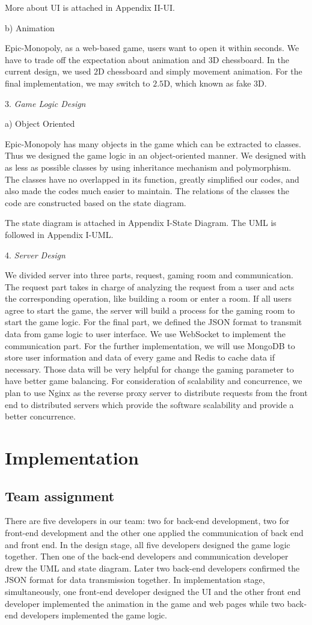 \documentclass[a4paper,11pt]{article}
\begin{document}
More about UI is attached in Appendix II-UI.

b)	Animation

Epic-Monopoly, as a web-based game, users want to open it within seconds. We have to trade off the expectation about animation and $3$D chessboard. In the current design, we used $2$D chessboard and simply movement animation. For the final implementation, we may switch to $2.5$D, which known as fake $3$D.

3.	\emph{Game Logic Design}

a)	Object Oriented

Epic-Monopoly has many objects in the game which can be extracted to classes. Thus we designed the game logic in an object-oriented manner. We designed with as less as possible classes by using inheritance mechanism and polymorphism. The classes have no overlapped in its function, greatly simplified our codes, and also made the codes much easier to maintain. The relations of the classes the code are constructed based on the state diagram. 

The state diagram is attached in Appendix I-State Diagram.
The UML is followed in Appendix I-UML.

4.	\emph{Server Design}

We divided server into three parts, request, gaming room and communication. The request part takes in charge of analyzing the request from a user and acts the corresponding operation, like building a room or enter a room. If all users agree to start the game, the server will build a process for the gaming room to start the game logic. For the final part, we defined the JSON format to transmit data from game logic to user interface. We use WebSocket to implement the communication part. For the further implementation, we will use MongoDB to store user information and data of every game and Redis to cache data if necessary. Those data will be very helpful for change the gaming parameter to have better game balancing. For consideration of scalability and concurrence, we plan to use Nginx as the reverse proxy server to distribute requests from the front end to distributed servers which provide the software scalability and provide a better concurrence.

\section{Implementation}
\subsection{Team assignment}
There are five developers in our team: two for back-end development, two for front-end development and the other one applied the communication of back end and front end. In the design stage, all five developers designed the game logic together. Then one of the back-end developers and communication developer drew the UML and state diagram. Later two back-end developers confirmed the JSON format for data transmission together. In implementation stage, simultaneously, one front-end developer designed the UI and the other front end developer implemented the animation in the game and web pages while two back-end developers implemented the game logic.
\end{document}

